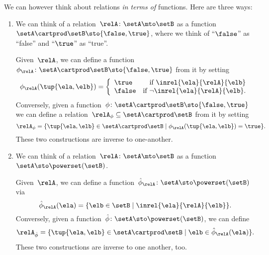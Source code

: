 \begin{remark}
    \label{re:rel-three-fun-descriptions}
    We can however think about relations \emph{in terms of} functions.
    Here are three ways:
    \begin{enumerate}
        \item We can think of a relation~$\relA \colon \setA \mto\setB$ as a function~$\setA \cartprod \setB \sto \{ \false, \true \}$, where we think of ``$\false$'' as ``false'' and ``$\true$'' as ``true''.

              Given~$\relA$, we can define a function~$\phi_{\relA} \colon \setA \cartprod \setB \sto \{ \false, \true \}$ from it by setting
              \begin{equation}
                  \phi_{\relA}(\tup{\ela, \elb}) =
                  \left
                  \{\begin{array}{lr}
                      \true  & \text{if } \inrel{\ela}{\relA}{\elb}      \\
                      \false & \text{if } \neg\inrel{\ela}{\relA}{\elb}.
                  \end{array}
                  \right.
              \end{equation}
              Conversely, given a function~$\phi\colon \setA \cartprod \setB \sto \{ \false, \true \}$ we can define a relation~$\relA_{\phi} \subseteq \setA \cartprod \setB$ from it by setting
              \begin{equation}
                  \relA_{\phi} = \{ \tup{\ela, \elb} \in \setA \cartprod \setB \mid \phi_{\relA}(\tup{\ela, \elb}) = \true \}.
              \end{equation}
              These two constructions are inverse to one-another.

        \item We can think of a relation~$\relA \colon \setA \mto \setB$ as a function~$\setA  \sto \powerset (\setB)$.

              Given~$\relA$, we can define a function~$\hat \phi_{\relA} \colon \setA \sto \powerset (\setB)$ via
              \begin{equation}
                  \hat \phi_{\relA} (\ela) = \{ \elb \in \setB \mid \inrel{\ela}{\relA}{\elb}\}.
              \end{equation}
              Conversely, given a function~$\hat \phi \colon \setA \sto \powerset (\setB)$, we can define
              \begin{equation}
                  \relA_{\hat \phi} = \{ \tup{\ela, \elb} \in \setA \cartprod \setB \mid \elb \in \hat \phi_{\relA}(\ela)   \}.
              \end{equation}
              These two constructions are inverse to one another, too.


\end{enumerate}
\end{remark}
